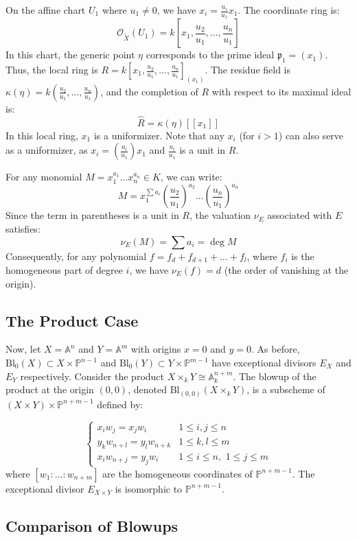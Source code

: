 On the affine chart $U_1$ where $u_1 \neq 0$, we have $x_i = \frac{u_i}{u_1} x_1$. 
The coordinate ring is:$$\mathcal{O}_{\tilde{X}}(U_1) = k\left[x_1, \frac{u_2}{u_1}, \dots, \frac{u_n}{u_1}\right]$$
In this chart, the generic point $\eta$ corresponds to the prime ideal $\mathfrak{p}_1 = (x_1)$. Thus, the local ring is $R = k[x_1, \frac{u_2}{u_1}, \dots, \frac{u_n}{u_1}]_{(x_1)}$. 
The residue field is $\kappa(\eta) = k(\frac{u_2}{u_1}, \dots, \frac{u_n}{u_1})$, and the completion of $R$ with respect to its maximal ideal is:
$$\hat{R} = \kappa(\eta)[[x_1]]$$
In this local ring, $x_1$ is a uniformizer. Note that any $x_i$ (for $i > 1$) can also serve as a uniformizer, 
as $x_i = (\frac{u_i}{u_1}) x_1$ and $\frac{u_i}{u_1}$ is a unit in $R$.

For any monomial $M = x_1^{a_1} \dots x_n^{a_n} \in K$, we can write:
$$M = x_1^{\sum a_i} \left( \frac{u_2}{u_1} \right)^{a_2} \dots \left( \frac{u_n}{u_1} \right)^{a_n}$$
Since the term in parentheses is a unit in $R$, the valuation $\nu_E$ associated with $E$ satisfies:
$$\nu_E(M) = \sum a_i = \deg M$$
Consequently, for any polynomial $f = f_d + f_{d+1} + \dots + f_l$, where $f_i$ is the homogeneous part of degree $i$, we have $\nu_E(f) = d$ (the order of vanishing at the origin).

\subsection*{The Product Case}
Now, let $X = \mathbb{A}^n$ and $Y = \mathbb{A}^m$ with origins $x=0$ and $y=0$. 
As before, $\text{Bl}_0(X) \subset X \times \mathbb{P}^{n-1}$ and $\text{Bl}_0(Y) \subset Y \times \mathbb{P}^{m-1}$ have exceptional divisors $E_X$ and $E_Y$ respectively.
Consider the product $X \times_k Y \cong \mathbb{A}_k^{n+m}$. 
The blowup of the product at the origin $(0,0)$, denoted $\text{Bl}_{(0,0)}(X \times_k Y)$, is a subscheme of $(X \times Y) \times \mathbb{P}^{n+m-1}$ defined by:

$$\begin{cases} 
x_i w_j = x_j w_i & 1 \le i, j \le n \\
y_k w_{n+l} = y_l w_{n+k} & 1 \le k, l \le m \\
x_i w_{n+j} = y_j w_i & 1 \le i \le n, \,\, 1 \le j \le m 
\end{cases}$$
where $[w_1 : \dots : w_{n+m}]$ are the homogeneous coordinates of $\mathbb{P}^{n+m-1}$. The exceptional divisor $E_{X \times Y}$ is isomorphic to $\mathbb{P}^{n+m-1}$.

\subsection*{Comparison of Blowups}


